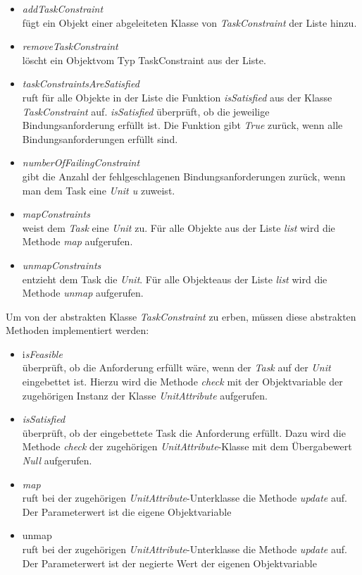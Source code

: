 \begin{itemize}
\item \textit{addTaskConstraint}\\
fügt ein Objekt einer abgeleiteten Klasse von \textit{TaskConstraint} der Liste hinzu. 
\item \textit{removeTaskConstraint}\\
löscht ein Objektvom Typ TaskConstraint aus der Liste.
\item \textit{taskConstraintsAreSatisfied}\\
ruft für alle Objekte in der Liste die Funktion \textit{isSatisfied} aus der Klasse \textit{TaskConstraint} auf. \textit{isSatisfied} überprüft, ob die jeweilige Bindungsanforderung erfüllt ist. Die Funktion gibt \textit{True} zurück, wenn alle Bindungsanforderungen erfüllt sind.%
\item \textit{numberOfFailingConstraint}\\
gibt die Anzahl der fehlgeschlagenen Bindungsanforderungen zurück, wenn man dem Task eine \textit{Unit u} zuweist. 
\item \textit{mapConstraints}\\
weist dem \textit{Task} eine \textit{Unit} zu. Für alle Objekte aus der Liste \textit{list} wird die Methode \textit{map} aufgerufen.
\item \textit{unmapConstraints}\\
entzieht dem Task die \textit{Unit}. Für alle Objekteaus der Liste \textit{list} wird die Methode \textit{unmap} aufgerufen.
\end{itemize}

Um von der abstrakten Klasse \textit{TaskConstraint} zu erben, müssen diese abstrakten Methoden implementiert werden:\\
\begin{itemize}
\item i\textit{sFeasible}\\
überprüft, ob die Anforderung erfüllt wäre, wenn der \textit{Task} auf der \textit{Unit} eingebettet ist. Hierzu wird die Methode \textit{check} mit der Objektvariable der zugehörigen Instanz der Klasse \textit{UnitAttribute} aufgerufen.
\item \textit{isSatisfied}\\
überprüft, ob der eingebettete Task die Anforderung erfüllt. Dazu wird die Methode \textit{check} der zugehörigen \textit{UnitAttribute}-Klasse mit dem Übergabewert \textit{Null} aufgerufen. 
\item \textit{map} \\
ruft bei der zugehörigen \textit{UnitAttribute}-Unterklasse die Methode \textit{update} auf. Der Parameterwert ist die eigene Objektvariable
\item \textit{}unmap\\
ruft bei der zugehörigen \textit{UnitAttribute}-Unterklasse die Methode \textit{update} auf. Der Parameterwert ist der negierte Wert der eigenen Objektvariable
\end{itemize}

